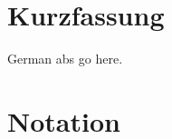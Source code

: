 \documentclass[oneside]{scrbook}
\theoremstyle{definition}
\theoremstyle{definition}
\theoremstyle{remark}
\begin{document}
% 
%                                                               
%                                                               
%                                                               
% 

\chapter{Kurzfassung}
German abs go here.

% 
%                                                                                         
%                                                                                         
%                                                                                         
% 

\chapter{Notation}
\end{document}
